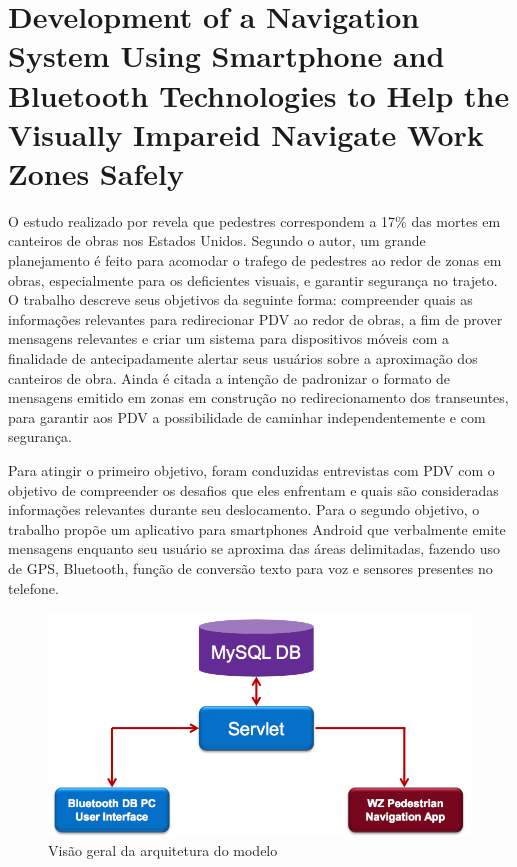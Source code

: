 \documentclass[english,brazilian]{UNISINOSmonografia}
\begin{document}
	\section{Development of a Navigation System Using Smartphone and Bluetooth Technologies to Help the Visually Impareid Navigate Work Zones Safely} 

O estudo realizado por  revela que pedestres correspondem a 17\% das mortes em canteiros de obras nos Estados Unidos. Segundo o autor, um grande planejamento é feito para acomodar o trafego de pedestres ao redor de zonas em obras, especialmente para os deficientes visuais, e garantir segurança no trajeto. O trabalho descreve seus objetivos da seguinte forma: compreender quais as informações relevantes para redirecionar PDV ao redor de obras, a fim de prover mensagens relevantes e criar um sistema para dispositivos móveis com a finalidade de antecipadamente alertar seus usuários sobre a aproximação dos canteiros de obra. Ainda é citada a intenção de padronizar o formato de mensagens emitido em zonas em construção no redirecionamento dos transeuntes, para garantir aos PDV a possibilidade de caminhar independentemente e com segurança.

Para atingir o primeiro objetivo, foram conduzidas entrevistas com PDV com o objetivo de compreender os desafios que eles enfrentam e quais são consideradas informações relevantes durante seu deslocamento. Para o segundo objetivo, o trabalho propõe um aplicativo para smartphones Android que verbalmente emite mensagens enquanto seu usuário se aproxima das áreas delimitadas, fazendo uso de GPS, Bluetooth, função de conversão texto para voz e sensores presentes no telefone. 


\begin{figure}[!ht]
	\caption{Visão geral da arquitetura do modelo}
	\label{fig:visaoGeralWorkzones}
	\centering%
	\begin{minipage}{.6\textwidth}
		\includegraphics[width=\textwidth]{imgs/workzoneArquitetura}
		\end{minipage}
\end{figure}
\end{document}
